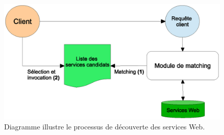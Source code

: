 \begin{figure}[h]
    \centering
    \includegraphics[width=1\textwidth]{figs/ws-discovery-with-matching.eps}
    \caption{Diagramme illustre le processus de découverte des
      services Web.}
    \label{fig:ws-discovery-with-matching}
\end{figure}

